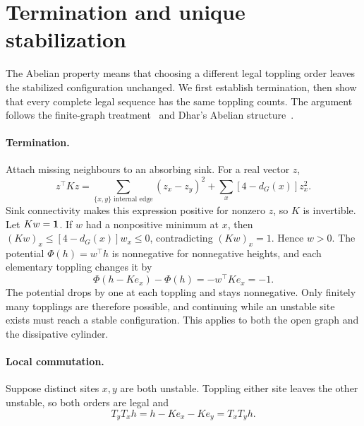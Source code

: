 \section{Termination and unique stabilization}\label{sec:abelian}
The Abelian property means that choosing a different legal toppling order leaves the stabilized configuration unchanged. We first establish termination, then show that every complete legal sequence has the same toppling counts. The argument follows the finite-graph treatment~\cite[Theorem 2.3 and Exercise 2.6]{jarai2018} and Dhar's Abelian structure~\cite{dhar1990}.

\paragraph{Termination.}
Attach missing neighbours to an absorbing sink. For a real vector $z$,
\begin{equation}
 z^\top Kz=\sum_{\{x,y\}\text{ internal edge}}(z_x-z_y)^2+
               \sum_x[4-d_G(x)]z_x^2.
\end{equation}
Sink connectivity makes this expression positive for nonzero $z$, so $K$ is invertible. Let $Kw=\mathbf 1$. If $w$ had a nonpositive minimum at $x$, then $(Kw)_x\leq[4-d_G(x)]w_x\leq0$, contradicting $(Kw)_x=1$. Hence $w>0$. The potential $\Phi(h)=w^\top h$ is nonnegative for nonnegative heights, and each elementary toppling changes it by
\begin{equation}
 \Phi(h-Ke_x)-\Phi(h)=-w^\top Ke_x=-1.
\end{equation}
The potential drops by one at each toppling and stays nonnegative. Only finitely many topplings are therefore possible, and continuing while an unstable site exists must reach a stable configuration. This applies to both the open graph and the dissipative cylinder.

\paragraph{Local commutation.}
Suppose distinct sites $x,y$ are both unstable. Toppling either site leaves the other unstable, so both orders are legal and
\begin{equation}
 T_yT_xh=h-Ke_x-Ke_y=T_xT_yh.
\end{equation}


